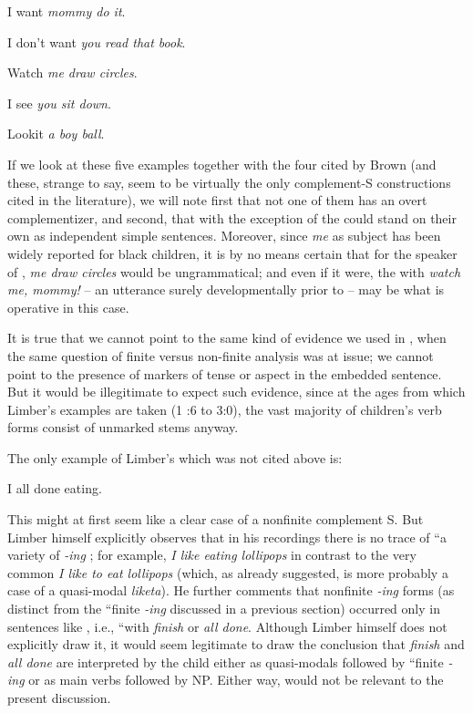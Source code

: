 \ea\label{ex:3:32}
I want \textit{mommy do it}.
\z

\ea\label{ex:3:33}
 I don't want \textit{you read that book}.
\z

\ea\label{ex:3:34}
 Watch \textit{me draw circles}.
\z

\ea\label{ex:3:35}
 I see \textit{you sit down}.
\z

\ea\label{ex:3:36}
 Lookit \textit{a boy  ball}.
\z

If we look at these five examples together with the four cited by Brown (and these, strange to say, seem to be virtually the only complement-S constructions cited in the literature), we will note first that not one of them has an overt complementizer, and second, that with the exception of  the  could stand on their own as independent simple sentences. Moreover, since \textit{me} as subject has been widely reported for black children, it is by no means certain that for the speaker of , \textit{me draw circles} would be ungrammatical; and even if it were, the  with \textit{watch me, mommy!} -- an utterance surely developmentally prior to  -- may be what is operative in this case.

It is true that we cannot point to the same kind of evidence
we used in , when the same question of finite versus non-finite analysis was at issue; we cannot point to the presence of markers of tense or aspect in the embedded sentence. But it would be illegitimate to expect such evidence, since at the ages from which Limber's examples are taken (1 :6 to 3:0), the vast majority of children's verb forms consist of unmarked stems anyway.

The only example of Limber's which was not cited above is:

\ea\label{ex:3:37}
 I all done eating.
\z

\noindent This might at first seem like a clear case of a nonfinite complement S. But Limber himself explicitly observes that in his recordings there is no trace of ``a variety of \textit{-ing} ; for example, \textit{I like eating lollipops} in contrast to the very common \textit{I like to eat lollipops} (which, as already suggested, is more probably a case of a quasi-modal \textit{liketa}). He further comments that nonfinite \textit{-ing} forms (as distinct from the ``finite \textit{-ing} discussed in a previous section) occurred only in sentences like , i.e., ``with \textit{finish} or \textit{all done}. Although Limber himself does not explicitly draw it, it would seem legitimate to draw the conclusion that \textit{finish} and \textit{all done} are interpreted by the child either as quasi-modals followed by ``finite \textit{-ing} or as main verbs followed by NP. Either way,  would not be relevant to the present discussion.

